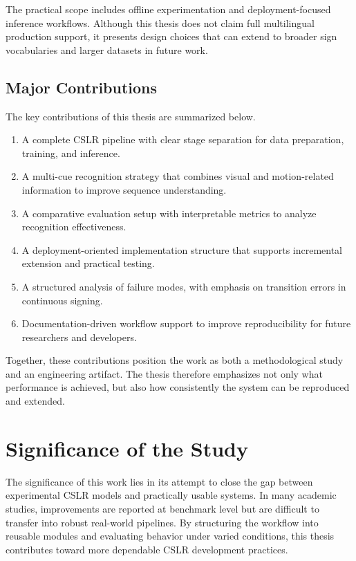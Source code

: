 The practical scope includes offline experimentation and deployment-focused inference workflows. Although this thesis does not claim full multilingual production support, it presents design choices that can extend to broader sign vocabularies and larger datasets in future work.

\subsection{Major Contributions}

The key contributions of this thesis are summarized below.

\begin{enumerate}
\item A complete CSLR pipeline with clear stage separation for data preparation, training, and inference.
\item A multi-cue recognition strategy that combines visual and motion-related information to improve sequence understanding.
\item A comparative evaluation setup with interpretable metrics to analyze recognition effectiveness.
\item A deployment-oriented implementation structure that supports incremental extension and practical testing.
\item A structured analysis of failure modes, with emphasis on transition errors in continuous signing.
\item Documentation-driven workflow support to improve reproducibility for future researchers and developers.
\end{enumerate}

Together, these contributions position the work as both a methodological study and an engineering artifact. The thesis therefore emphasizes not only what performance is achieved, but also how consistently the system can be reproduced and extended.

\section{Significance of the Study}

The significance of this work lies in its attempt to close the gap between experimental CSLR models and practically usable systems. In many academic studies, improvements are reported at benchmark level but are difficult to transfer into robust real-world pipelines. By structuring the workflow into reusable modules and evaluating behavior under varied conditions, this thesis contributes toward more dependable CSLR development practices.

